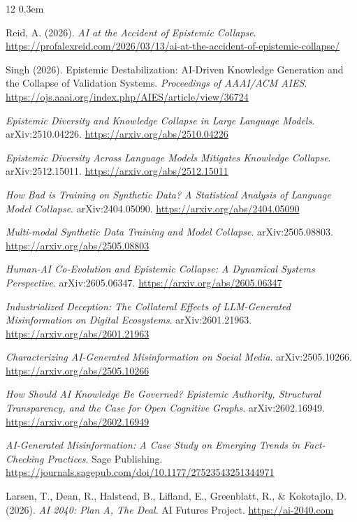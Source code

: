 \documentclass[11pt,letterpaper]{article}
\begin{document}
\begin{thebibliography}{12}
\itemsep0.3em

Reid, A. (2026). \emph{AI at the Accident of Epistemic Collapse}. \url{https://profalexreid.com/2026/03/13/ai-at-the-accident-of-epistemic-collapse/}

Singh (2026). Epistemic Destabilization: AI-Driven Knowledge Generation and the Collapse of Validation Systems. \emph{Proceedings of AAAI/ACM AIES}. \url{https://ojs.aaai.org/index.php/AIES/article/view/36724}

\emph{Epistemic Diversity and Knowledge Collapse in Large Language Models}. arXiv:2510.04226. \url{https://arxiv.org/abs/2510.04226}

\emph{Epistemic Diversity Across Language Models Mitigates Knowledge Collapse}. arXiv:2512.15011. \url{https://arxiv.org/abs/2512.15011}

\emph{How Bad is Training on Synthetic Data? A Statistical Analysis of Language Model Collapse}. arXiv:2404.05090. \url{https://arxiv.org/abs/2404.05090}

\emph{Multi-modal Synthetic Data Training and Model Collapse}. arXiv:2505.08803. \url{https://arxiv.org/abs/2505.08803}

\emph{Human-AI Co-Evolution and Epistemic Collapse: A Dynamical Systems Perspective}. arXiv:2605.06347. \url{https://arxiv.org/abs/2605.06347}

\emph{Industrialized Deception: The Collateral Effects of LLM-Generated Misinformation on Digital Ecosystems}. arXiv:2601.21963. \url{https://arxiv.org/abs/2601.21963}

\emph{Characterizing AI-Generated Misinformation on Social Media}. arXiv:2505.10266. \url{https://arxiv.org/abs/2505.10266}

\emph{How Should AI Knowledge Be Governed? Epistemic Authority, Structural Transparency, and the Case for Open Cognitive Graphs}. arXiv:2602.16949. \url{https://arxiv.org/abs/2602.16949}

\emph{AI-Generated Misinformation: A Case Study on Emerging Trends in Fact-Checking Practices}. Sage Publishing. \url{https://journals.sagepub.com/doi/10.1177/27523543251344971}

Larsen, T., Dean, R., Halstead, B., Lifland, E., Greenblatt, R., \& Kokotajlo, D. (2026). \emph{AI 2040: Plan A, The Deal}. AI Futures Project. \url{https://ai-2040.com}

\end{thebibliography}
\end{document}
